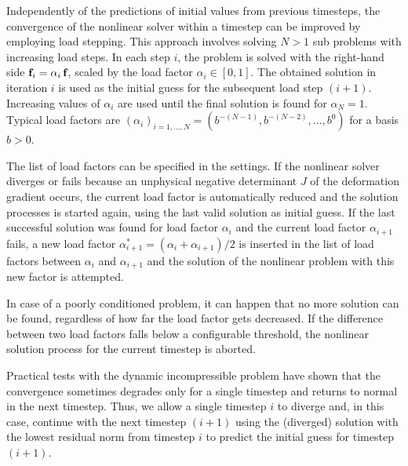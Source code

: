 Independently of the predictions of initial values from previous timesteps, the convergence of the nonlinear solver within a timestep can be  improved by employing load stepping. This approach involves solving $N>1$ sub problems with increasing load steps. In each step $i$, the problem is solved with the right-hand side $\textbf{f}_i = \alpha_i\,\textbf{f}$, scaled by the load factor $\alpha_i \in [0,1]$. The obtained solution in iteration $i$ is used as the initial guess for the subsequent load step $(i+1)$. Increasing values of $\alpha_i$ are used until the final solution is found for $\alpha_N=1$. Typical load factors are $(\alpha_i)_{i=1,\dots,N} = (b^{-(N-1)}, b^{-(N-2)}, \dots, b^{0})$ for a basis $b>0$.

The list of load factors can be specified in the settings. If the nonlinear solver diverges or fails because an unphysical negative determinant $J$ of the deformation gradient occurs, the current load factor is automatically reduced and the solution processes is started again, using the last valid solution as initial guess. If the last successful solution was found for load factor $\alpha_i$ and the current load factor $\alpha_{i+1}$ fails, a new load factor $\alpha^\ast_{i+1} = (\alpha_i + \alpha_{i+1})/2$ is inserted in the list of load factors between $\alpha_i$ and $\alpha_{i+1}$ and the solution of the nonlinear problem with this new factor is attempted. 

In case of a poorly conditioned problem, it can happen that no more solution can be found, regardless of how far the load factor gets decreased. If the difference between two load factors falls below a configurable threshold, the nonlinear solution process for the current timestep is aborted.

Practical tests with the dynamic incompressible problem have shown that the convergence sometimes degrades only for a single timestep and returns to normal in the next timestep. Thus, we allow a single timestep $i$ to diverge and, in this case, continue with the next timestep $(i+1)$ using the (diverged) solution with the lowest residual norm from timestep $i$ to predict the initial guess for timestep $(i+1)$.

